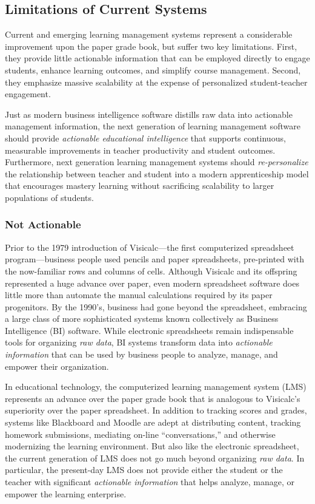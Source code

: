 \documentclass{article}
\begin{document}
\subsection{Limitations of Current Systems}
\label{sec:current-limitations}

Current and emerging learning management systems
represent a considerable improvement upon the paper grade book,
but suffer two key limitations.
First, they provide little actionable information
that can be employed directly
to engage students,
enhance learning outcomes,
and simplify course management.
Second, they emphasize massive scalability
at the expense of
personalized student-teacher engagement.

Just as modern business intelligence software
distills raw data into actionable management information,
the next generation of learning management software
should provide
\emph{actionable educational intelligence}
that supports continuous, measurable improvements
in teacher productivity and student outcomes.
Furthermore, next generation learning management systems
should \emph{re-personalize}
the relationship between teacher and student
into a modern apprenticeship model that
encourages mastery learning without sacrificing scalability
to larger populations of students.

\subsubsection{Not Actionable}

Prior to the 1979 introduction of
Visicalc---the first computerized spreadsheet program---business people
used pencils and paper spreadsheets,
pre-printed with the now-familiar rows and columns of cells.
Although Visicalc and its offspring represented a huge advance over paper,
even modern spreadsheet software does little more than automate the manual
calculations required by its paper progenitors.
By the 1990's,
business had gone beyond the spreadsheet,
embracing a large class of more sophisticated
systems known collectively as Business Intelligence (BI) software.
While electronic spreadsheets remain indispensable tools for organizing \emph{raw data},
BI systems transform data into \emph{actionable information}
that can be used by business people
to analyze, manage, and empower their organization.

In educational technology,
the computerized learning management system (LMS)
represents an advance over the paper grade book
that is analogous to Visicalc's superiority over the paper spreadsheet.
In addition to tracking scores and grades,
systems like Blackboard and Moodle
are adept at distributing content,
tracking homework submissions,
mediating on-line ``conversations,''
and otherwise modernizing the learning environment.
But also like the electronic spreadsheet,
the current generation of LMS does not go much beyond organizing \emph{raw data}.
In particular, the present-day LMS does not provide either the student or the teacher
with significant \emph{actionable information} that helps
analyze, manage, or empower the learning enterprise.
\end{document}
